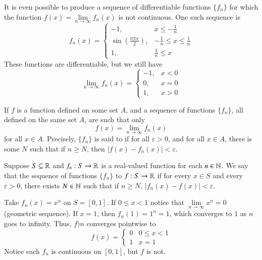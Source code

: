 \documentclass[12pt, a4paper, oneside, openright, titlepage]{book}
\begin{document}
\begin{eg}
    It is even possible to produce a sequence of differentiable functions $\{f_n\}$ for which the function $f(x) = \lim\limits_{n\rightarrow \infty}f_n(x)$ is not continuous. One such sequence is \begin{equation*}
        f_n(x) = \left\{\begin{array}{lc} -1, &  x \leq -\frac{1}{n} \\ \sin\left(\frac{n\pi x}{2}\right), & -\frac{1}{n} \leq x \leq \frac{1}{n} \\ 1, & \frac{1}{n} \leq x \end{array}\right.
    \end{equation*}
    These functions are differentiable, but we still have  \begin{equation*}
        \lim\limits_{n\rightarrow \infty}f_n(x) = \left\{\begin{array}{lc} -1, & x < 0 \\ 0, & x = 0 \\ 1, & x > 0 \end{array}\right.
    \end{equation*}
\end{eg}

\begin{defn}
    If $f$ is a function defined on some set $A$, and a sequence of functions $\{f_n\}$, all defined on the same set $A$, are such that only \begin{equation*}
        f(x) = \lim\limits_{n\rightarrow \infty}f_n(x)
    \end{equation*}
    for all $x \in A$. Precisely, $\{f_n\}$ is said to  if for all $\varepsilon > 0$, and for all $x \in A$, there is some $N$ such that if $n \geq N$, then $|f(x) - f_n(x)| < \varepsilon$.
\end{defn}

\begin{defn}
    Suppose $S \subseteq \mathbb R$ and $f_n:S\rightarrow \mathbb R$ is a real-valued function for each $n \in \mathbb N$. We say that the sequence of functions $\{f_n\}$  to $f:S\rightarrow \mathbb R$ if for every $x \in S$ and every $\varepsilon > 0$, there exists $N \in \mathbb N$ such that if $n \geq N$, $|f_n(x) - f(x)| < \varepsilon$.
\end{defn}

\begin{eg}
    Take $f_n(x) = x^n$ on $S = [0,1]$. If $0 \leq x < 1$ notice that $\lim\limits_{n\rightarrow \infty}x^n = 0$ (geometric sequence). If $x = 1$, then $f_n(1) = 1^n = 1$, which converges to $1$ as $n$ goes to infinity. Thus, $f)n$ converges pointwise to \begin{equation*}
        f(x) = \left\{\begin{array}{lc} 0 & 0 \leq x < 1 \\ 1 & x = 1\end{array}\right.
    \end{equation*}
    Notice each $f_n$ is continuous on $[0,1]$, but $f$ is not.
\end{eg}
\end{document}
